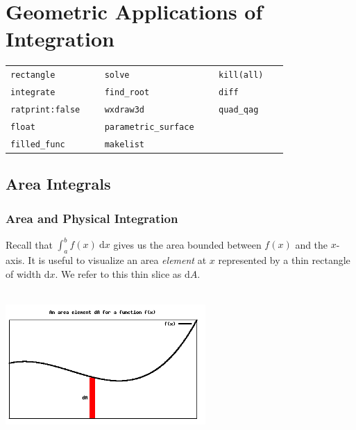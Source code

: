 \documentclass[10.5pt,twoside]{report}
\theoremstyle{definition}
\begin{document}
\pagebreak

\chapter{Geometric Applications of Integration}

\vspace*{\fill}

\minitoc

\vspace*{\fill}


\newline
\newline

\begin{tabular}{l l l}
 \verb|rectangle   |   &\verb|solve   |   &\verb|kill(all)   |   \\
 \verb|integrate   |   &\verb|find_root   |   &\verb|diff   |   \\
 \verb|ratprint:false   |   &\verb|wxdraw3d   |   &\verb|quad_qag   |   \\
 \verb|float   |   &\verb|parametric_surface   |   &\verb|   |   \\
 \verb|filled_func   |   &\verb|makelist   |   &\verb|   |   \\
\end{tabular}



\pagebreak
\section{Area Integrals}\label{Area Integrals}

\subsection{Area and Physical Integration}

Recall that $\displaystyle \int_{a}^{b} f(x) \ \mathrm{d}x$ gives us the area bounded between $f(x)$ and the $x$-axis.  It is useful to visualize an area \textit{element} at $x$ represented by a thin rectangle of width $\mathrm{d}x$.  We refer to this thin slice as $\mathrm{d}A$.  \\
${}$\\

\begin{center}
\includegraphics[width=3in]{figure_3_1_1_1}
\end{center}
\end{document}
